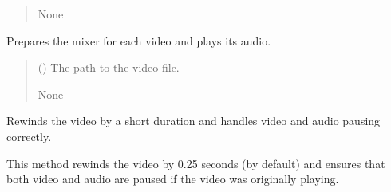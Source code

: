 \documentclass[letterpaper,10pt,english]{sphinxmanual}
\begin{document}
\begin{fulllineitems}
\begin{fulllineitems}
\begin{quote}
\begin{description}
\sphinxAtStartPar
None

\sphinxAtStartPar
{} \textendash{} 

\end{description}\end{quote}

\end{fulllineitems}


\begin{fulllineitems}
\label{\detokenize{general_interface:general_interface.LecteurVideo.preparer_son_video}}
\pysigstartsignatures
{}
\pysigstopsignatures
\sphinxAtStartPar
Prepares the mixer for each video and plays its audio.
\begin{quote}\begin{description}
\sphinxAtStartPar
{} () \textendash{} The path to the video file.

\sphinxAtStartPar
None

\sphinxAtStartPar
{} \textendash{} 

\end{description}\end{quote}

\end{fulllineitems}


\begin{fulllineitems}
\label{\detokenize{general_interface:general_interface.LecteurVideo.recule_progress}}
\pysigstartsignatures
{}
\pysigstopsignatures
\sphinxAtStartPar
Rewinds the video by a short duration and handles video and audio pausing correctly.

\sphinxAtStartPar
This method rewinds the video by 0.25 seconds (by default) and ensures that both video
and audio are paused if the video was originally playing.
\begin{quote}\begin{description}
\sphinxAtStartPar
{} \textendash{} 


\end{description}
\end{quote}
\end{fulllineitems}
\end{fulllineitems}
\end{document}
